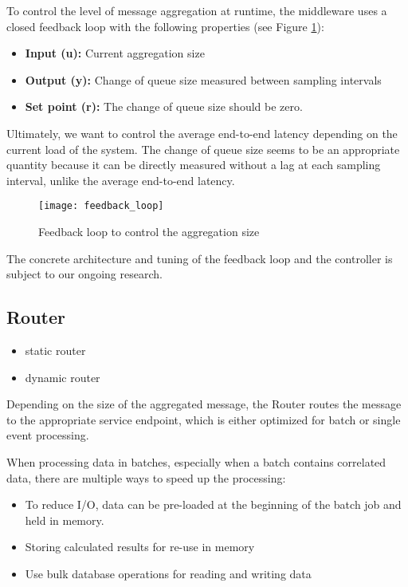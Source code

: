 To control the level of message aggregation at runtime, the middleware uses a closed feedback loop with the following properties (see Figure \ref{fig:feedback_loop}):

\begin{itemize}
	\item \textbf{Input (u):} Current aggregation size
	\item \textbf{Output (y):} Change of queue size measured between sampling intervals
	\item \textbf{Set point (r):} The change of queue size should be zero.
\end{itemize}

Ultimately, we want to control the average end-to-end latency depending on the current load of the system. The change of queue size seems to be an appropriate quantity because it can be directly measured without a lag at each sampling interval, unlike the average end-to-end latency.

\begin{figure}[htbp]
	\centering
	\texttt{[image: feedback\_loop]}
	\caption{Feedback loop to control the aggregation size}
	\label{fig:feedback_loop}
\end{figure}
The concrete architecture and tuning of the feedback loop and the controller is subject to our ongoing research.
\subsection{Router}
\label{sec:ch05_router}

\begin{itemize}
	\item{static router}
	\item{dynamic router}
\end{itemize}

Depending on the size of the aggregated message, the Router routes the message to the appropriate service endpoint, which is either optimized for batch or single event processing.

When processing data in batches, especially when a batch contains correlated data, there are multiple ways to speed up the processing:
\begin{itemize}
	\item To reduce I/O, data can be pre-loaded at the beginning of the batch job and held in memory.
	\item Storing calculated results for re-use in memory
	\item Use bulk database operations for reading and writing data
\end{itemize}

